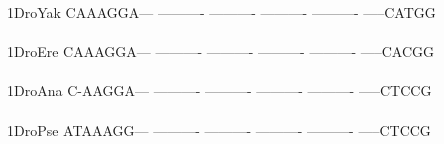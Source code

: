 \documentclass[11pt,twoside,reqno,a4paper]{article}
\begin{document}
{1\hspace*{3\charwidth}DroYak	CAAAGGA---	----------	----------	----------	----------	-----CATGG	\\
\hspace*{4\charwidth}\hspace*{7\charwidth}\hspace*{1\charwidth}\hspace*{1\charwidth}\hspace*{1\charwidth}\hspace*{1\charwidth}\hspace*{1\charwidth}\hspace*{1\charwidth}\\
1\hspace*{3\charwidth}DroEre	CAAAGGA---	----------	----------	----------	----------	-----CACGG	\\
\hspace*{4\charwidth}\hspace*{7\charwidth}\hspace*{1\charwidth}\hspace*{1\charwidth}\hspace*{1\charwidth}\hspace*{1\charwidth}\hspace*{1\charwidth}\hspace*{1\charwidth}\\
1\hspace*{3\charwidth}DroAna	C-AAGGA---	----------	----------	----------	----------	-----CTCCG	\\
\hspace*{4\charwidth}\hspace*{7\charwidth}\hspace*{1\charwidth}\hspace*{1\charwidth}\hspace*{1\charwidth}\hspace*{1\charwidth}\hspace*{1\charwidth}\hspace*{1\charwidth}\\
1\hspace*{3\charwidth}DroPse	ATAAAGG---	----------	----------	----------	----------	-----CTCCG	\\
\hspace*{4\charwidth}\hspace*{7\charwidth}\hspace*{1\charwidth}\hspace*{1\charwidth}\hspace*{1\charwidth}\hspace*{1\charwidth}\hspace*{1\charwidth}\hspace*{1\charwidth}\\
}
\end{document}
